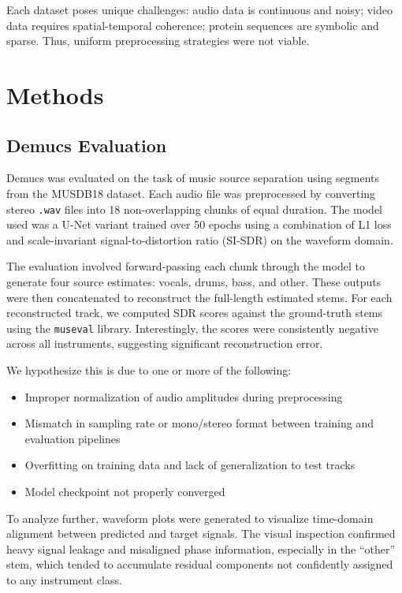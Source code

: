 \documentclass{article}
\begin{document}
Each dataset poses unique challenges: audio data is continuous and noisy; video data requires spatial-temporal coherence; protein sequences are symbolic and sparse. Thus, uniform preprocessing strategies were not viable.

\section{Methods}

\subsection{Demucs Evaluation}

Demucs was evaluated on the task of music source separation using segments from the MUSDB18 dataset. Each audio file was preprocessed by converting stereo \texttt{.wav} files into 18 non-overlapping chunks of equal duration. The model used was a U-Net variant trained over 50 epochs using a combination of L1 loss and scale-invariant signal-to-distortion ratio (SI-SDR) on the waveform domain.

The evaluation involved forward-passing each chunk through the model to generate four source estimates: vocals, drums, bass, and other. These outputs were then concatenated to reconstruct the full-length estimated stems. For each reconstructed track, we computed SDR scores against the ground-truth stems using the \texttt{museval} library. Interestingly, the scores were consistently negative across all instruments, suggesting significant reconstruction error.

We hypothesize this is due to one or more of the following:
\begin{itemize}
  \item Improper normalization of audio amplitudes during preprocessing
  \item Mismatch in sampling rate or mono/stereo format between training and evaluation pipelines
  \item Overfitting on training data and lack of generalization to test tracks
  \item Model checkpoint not properly converged
\end{itemize}

To analyze further, waveform plots were generated to visualize time-domain alignment between predicted and target signals. The visual inspection confirmed heavy signal leakage and misaligned phase information, especially in the ``other'' stem, which tended to accumulate residual components not confidently assigned to any instrument class.
\end{document}
